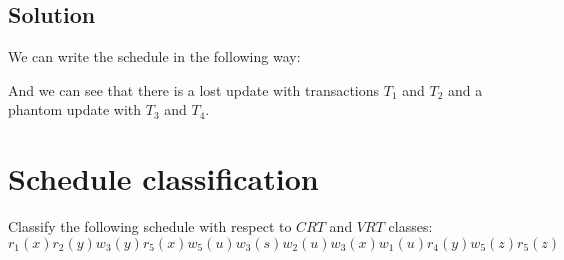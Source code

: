 \documentclass[12pt, a4paper]{report}
\newtheorem[style=M,bodystyle=\normalfont]{theorem}{Theorem}
\newtheorem[style=M,bodystyle=\normalfont]{corollary}{Corollary}
\newtheorem[style=M,bodystyle=\normalfont]{lemma}{Lemma}
\newtheorem[style=M,bodystyle=\normalfont]{definition}{Definition}
\begin{document}
    \subsection*{Solution}
        We can write the schedule in the following way:
    \begin{table}[H]
        \centering
    \end{table}
        And we can see that there is a lost update with transactions $T_1$ and $T_2$ and a phantom update with $T_3$ and $T_4$. 

    \newpage
    
    \section{Schedule classification}
        Classify the following schedule with respect to $CRT$ and $VRT$ classes: 
        \[r_1(x) r_2(y) w_3(y) r_5(x) w_5(u) w_3(s)w_2(u) w_3(x) w_1(u) r_4(y) w_5(z) r_5(z)\]
\end{document}
